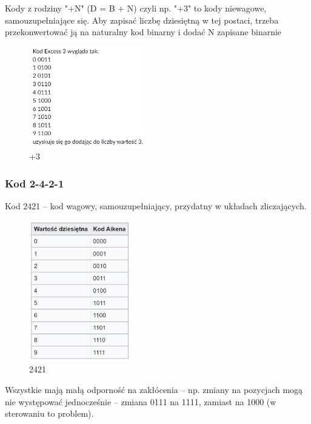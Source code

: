 Kody z rodziny "+N" (D = B + N) czyli np. "+3" to kody niewagowe, samouzupełniające się.
Aby zapisać liczbę dziesiętną w tej postaci, trzeba przekonwertować ją na naturalny kod binarny i dodać N zapisane binarnie

\begin{figure}[h!]
    \centering
    \includegraphics[width=0.45\textwidth]{images/codes/plus_three.png}
    \caption{+3}
    \label{fig:my_label}
\end{figure}

\subsubsection{Kod 2-4-2-1}

Kod 2421 – kod wagowy, samouzupełniający, przydatny w układach zliczających.

\begin{figure}[h!]
    \centering
    \includegraphics[width=0.4\textwidth]{images/codes/2421.png}
    \caption{2421}
    \label{fig:my_label}
\end{figure}

Wszystkie mają małą odporność na zakłócenia – np. zmiany na pozycjach mogą nie
występować jednocześnie – zmiana 0111 na 1111, zamiast na 1000 (w sterowaniu to problem).

\newpage


